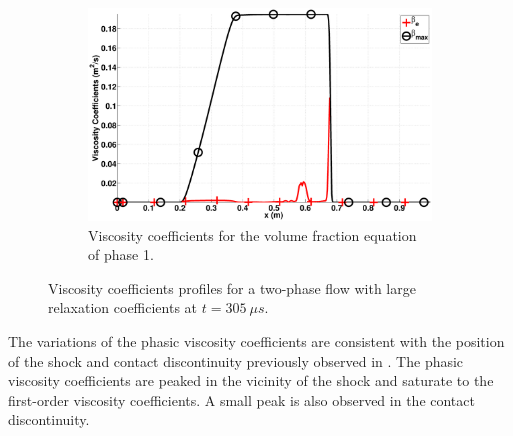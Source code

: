 \documentclass[preprint,10pt]{elsarticle}
\begin{document}
\begin{figure}[H]
        \begin{subfigure}[b]{0.495\textwidth}
                \centering
                \includegraphics[width=\textwidth]{figures/relaxation_phase_1_beta.eps}
                \caption{Viscosity coefficients for the volume fraction equation of phase 1.}
                \label{fig:inf-rel-beta}
        \end{subfigure}        
        \caption{Viscosity coefficients profiles for a two-phase flow with large relaxation coefficients at $t=305 \ \mu s$.}\label{fig:inf-rel-visc-coeff}
\end{figure}
%
The variations of the phasic viscosity coefficients are consistent with the position of the shock and contact discontinuity previously observed in . The phasic viscosity coefficients are peaked in the vicinity of the shock and saturate to the first-order viscosity coefficients. A small peak is also observed in the contact discontinuity.\\
%
\end{document}
